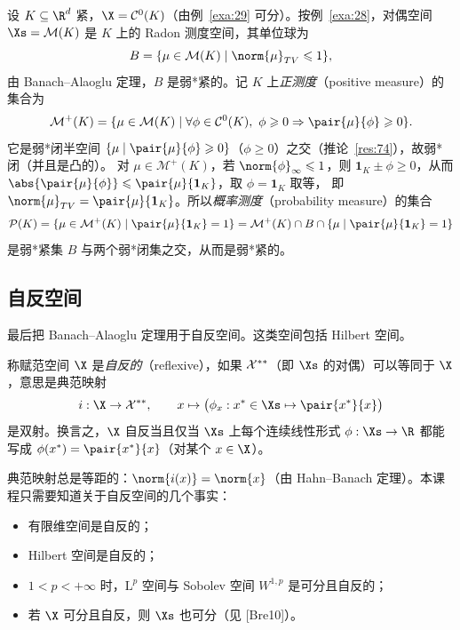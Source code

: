 \begin{example}[概率测度]
\label{exa:30}
设 $K\subseteq\R^d$ 紧，$\X=\mathcal{C}^0(K)$（由例~\ref{exa:29} 可分）。按例~\ref{exa:28}，对偶空间 $\Xs=\mathcal{M}(K)$ 是 $K$ 上的 Radon 测度空间，其单位球为
\[
  B=\{\mu\in\mathcal{M}(K)\mid\norm{\mu}_{TV}\leqslant1\},
\]
由 Banach--Alaoglu 定理，$B$ 是弱*紧的。记 $K$ 上\emph{正测度}（positive measure）的集合为
\[
  \mathcal{M}^+(K)=\{\mu\in\mathcal{M}(K)\mid\forall\phi\in\mathcal{C}^0(K),\ \phi\geqslant0\Rightarrow\pair{\mu}{\phi}\geqslant0\}.
\]
它是弱*闭半空间 $\{\mu\mid\pair{\mu}{\phi}\geqslant0\}$（$\phi\geqslant0$）之交（推论~\ref{res:74}），故弱*闭（并且是凸的）。
对 $\mu\in\mathcal{M}^+(K)$，若 $\norm{\phi}_\infty\leqslant1$，则 $\mathbf{1}_K\pm\phi\geqslant0$，从而 $\abs{\pair{\mu}{\phi}}\leqslant\pair{\mu}{\mathbf{1}_K}$，取 $\phi=\mathbf{1}_K$ 取等，
即 $\norm{\mu}_{TV}=\pair{\mu}{\mathbf{1}_K}$。所以\emph{概率测度}（probability measure）的集合
\[
  \mathcal{P}(K)=\{\mu\in\mathcal{M}^+(K)\mid\pair{\mu}{\mathbf{1}_K}=1\}=\mathcal{M}^+(K)\cap B\cap\{\mu\mid\pair{\mu}{\mathbf{1}_K}=1\}
\]
是弱*紧集 $B$ 与两个弱*闭集之交，从而是弱*紧的。
\end{example}

\subsection{自反空间}

最后把 Banach--Alaoglu 定理用于自反空间。这类空间包括 Hilbert 空间。

\begin{definition}[自反空间]
\label{def:41}
称赋范空间 $\X$ 是\emph{自反的}（reflexive），如果 $\mathcal{X}^{**}$（即 $\Xs$ 的对偶）可以等同于 $\X$，意思是典范映射
\[
  i:\X\to\Xss,\qquad x\mapsto\bigl(\phi_x:x^*\in\Xs\mapsto\pair{x^*}{x}\bigr)
\]
是双射。换言之，$\X$ 自反当且仅当 $\Xs$ 上每个连续线性形式 $\phi:\Xs\to\R$ 都能写成 $\phi(x^*)=\pair{x^*}{x}$（对某个 $x\in\X$）。
\end{definition}

典范映射总是等距的：$\norm{i(x)}=\norm{x}$（由 Hahn--Banach 定理）。本课程只需要知道关于自反空间的几个事实：
\begin{itemize}
  \item 有限维空间是自反的；
  \item Hilbert 空间是自反的；
  \item $1<p<+\infty$ 时，$\mathrm{L}^p$ 空间与 Sobolev 空间 $W^{1,p}$ 是可分且自反的；
  \item 若 $\X$ 可分且自反，则 $\Xs$ 也可分（见 [Bre10]）。
\end{itemize}

